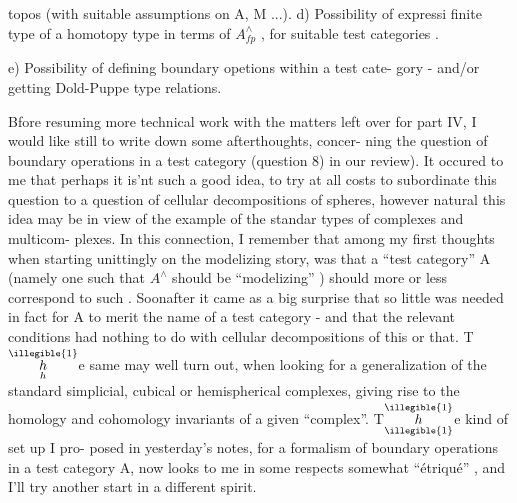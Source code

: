 
\margin{\{}topos (with suitable assumptions on A, M ...).
d) Possibility of expressi finite type of a homotopy type in terms
of $A^\wedge_{fp}$ , for suitable test categories .

e) Possibility of defining boundary opetions within a test cate-%
gory - and/or getting Dold-Puppe type relations.

\hand{$*\,\underset{*}{\phantom{*}}\,*$}

Bfore resuming more technical work with the matters left over for
part IV, I would like still to write down some afterthoughts, concer-%
ning the question of boundary operations in a test category (question
8) in our review). It occured to me that perhaps it is'nt such a good
idea, to try at all costs to subordinate this question to a question of
cellular decompositions of spheres, however natural this idea may be
in view of the example of the standar types of complexes and multicom-%
plexes. In this connection, I remember that among my first thoughts
when starting unittingly on the modelizing story, was that a ``test
category'' A (namely one such that $A^\wedge$ should be ``modelizing'' ) should
more or less correspond to such  . Soonafter it came as a
big surprise that so little was needed in fact for A to merit the name
of a test category - and that the  relevant conditions had nothing
to do with cellular decompositions of this or that. T$\overset{\illegible{1}}{\underset{h}{h}}$e same may well
turn out, when looking for a generalization of the standard simplicial,
cubical or hemispherical  complexes, giving rise to the homology and
cohomology invariants of a given ``complex''. T$\overset{\illegible{1}}{\underset{\illegible{1}}{h}}$e kind of set up I pro-%
posed in yesterday's notes, for a formalism of boundary operations
in a test category A, now looks to me in some respects somewhat 
``étriqué'' , and I'll try another start in a different spirit.

